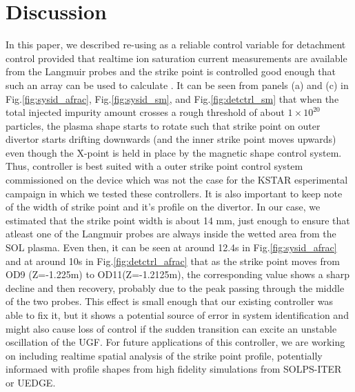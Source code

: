 \section{Discussion}
\label{sec:discussion}

In this paper, we described re-using \Afrac as a reliable control variable for detachment control provided that realtime ion saturation current measurements are available from the Langmuir probes and the strike point is controlled good enough that such an array can be used to calculate \Afrac.
It can be seen from panels (a) and (c) in Fig.\ref{fig:sysid_afrac}, Fig.\ref{fig:sysid_sm}, and Fig.\ref{fig:detctrl_sm} that when the total injected impurity amount crosses a rough threshold of about $1\times10^{20}$ particles, the plasma shape starts to rotate such that strike point on outer divertor starts drifting downwards (and the inner strike point moves upwards) even though the X-point is held in place by the magnetic shape control system.
Thus, \Afrac controller is best suited with a outer strike point control system commissioned on the device which was not the case for the KSTAR esperimental campaign in which we tested these controllers.
It is also important to keep note of the width of strike point and it's profile on the divertor.
In our case, we estimated that the strike point width is about 14 mm, just enough to ensure that atleast one of the Langmuir probes are always inside the wetted area from the \ac{SOL} plasma.
Even then, it can be seen at around 12.4s in Fig.\ref{fig:sysid_afrac} and at around 10s in Fig.\ref{fig:detctrl_afrac} that as the strike point moves from OD9 (Z=-1.225m) to OD11(Z=-1.2125m), the corresponding \Afrac value shows a sharp decline and then recovery, probably due to the peak passing through the middle of the two probes.
This effect is small enough that our existing controller was able to fix it, but it shows a potential source of error in system identification and might also cause loss of control if the sudden transition can excite an unstable oscillation of the \ac{UGF}.
For future applications of this controller, we are working on including realtime spatial analysis of the strike point profile, potentially informaed with profile shapes from high fidelity simulations from SOLPS-ITER or UEDGE.

